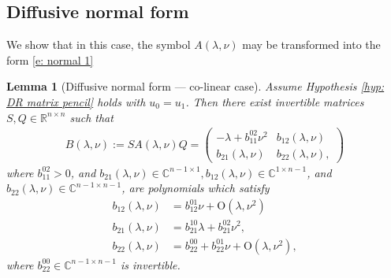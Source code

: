\documentclass[11pt]{article}
\newcommand{\R}{\mathbb{R}}
\newcommand{\C}{\mathbb{C}}
\newtheorem{lemma}[prop]{Lemma}
\numberwithin{equation}{section}
\numberwithin{prop}{section}
\begin{document}
\subsection{Diffusive normal form}
We show that in this case, the symbol $A(\lambda, \nu)$ may be transformed into the form \eqref{e: normal 1}
\begin{lemma}[Diffusive normal form --- co-linear case]\label{l: normal form colinear}
	Assume Hypothesis \ref{hyp: DR matrix pencil} holds with $u_0 = u_1$. Then there exist invertible matrices $S,Q \in \R^{n \times n}$ such that 
	\begin{align}
	B(\lambda, \nu) := S A(\lambda, \nu) Q = \begin{pmatrix}
	-\lambda + b_{11}^{02} \nu^2 & b_{12} (\lambda, \nu) \\
	b_{21} (\lambda, \nu) & b_{22}(\lambda, \nu), 
	\end{pmatrix}
	\label{e: colinear normal form}
	\end{align}
	where $ b_{11}^{02} > 0$, and $b_{21}(\lambda, \nu) \in \C^{n-1 \times 1}, b_{12}(\lambda, \nu) \in \C^{1 \times n-1}$, and $b_{22} (\lambda, \nu) \in \C^{n-1 \times n-1}$, are polynomials which satisfy 
	\begin{align}
	b_{12} (\lambda, \nu) &= b_{12}^{01} \nu + \mathrm{O}(\lambda, \nu^2) \\
	b_{21} (\lambda, \nu) &= b_{21}^{10} \lambda + b_{21}^{02} \nu^2,\\
	b_{22} (\lambda, \nu) &= b_{22}^{00} + b_{22}^{01} \nu + \mathrm{O}(\lambda, \nu^2),
	\end{align}
	where $b_{22}^{00} \in \C^{n-1 \times n-1}$ is invertible. 
\end{lemma}
\end{document}

